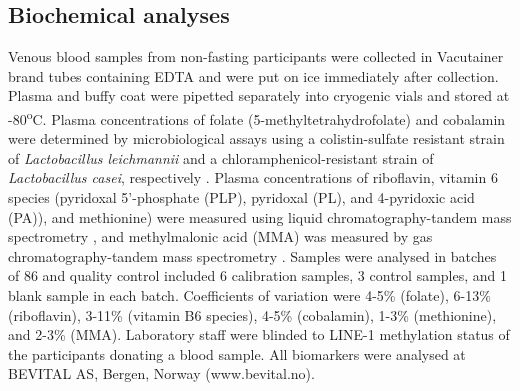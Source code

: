 \subsection{Biochemical analyses} %
\noindent Venous blood samples from non-fasting participants were collected in Vacutainer brand tubes containing EDTA and were put on ice immediately after collection. Plasma and buffy coat were pipetted separately into cryogenic vials and stored at -80\textsuperscript{o}C. Plasma concentrations of folate (5-methyltetrahydrofolate) and cobalamin were determined by microbiological assays using a colistin-sulfate resistant strain of \emph{Lactobacillus leichmannii} and a chloramphenicol-resistant strain of \emph{Lactobacillus casei}, respectively \cite{c323,c324}. Plasma concentrations of riboflavin, vitamin 6 species (pyridoxal 5'-phosphate (PLP), pyridoxal (PL), and 4-pyridoxic acid (PA)), and methionine) were measured using liquid chromatography-tandem mass spectrometry \cite{c325,c326}, and methylmalonic acid (MMA) was measured by gas chromatography-tandem mass spectrometry \cite{c327}. Samples were analysed in batches of 86 and quality control included 6 calibration samples, 3 control samples, and 1 blank 
sample in each batch. Coefficients of variation were 4-5\% (folate), 6-13\% (riboflavin), 3-11\% (vitamin B6 species), 4-5\% (cobalamin), 1-3\% (methionine), and 2-3\% (MMA). Laboratory staff were blinded to LINE-1 methylation status of the participants donating a blood sample. All biomarkers were analysed at BEVITAL AS, Bergen, Norway (www.bevital.no).

